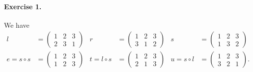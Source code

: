 \documentclass{article}
\begin{document}
\paragraph{Exercise 1.}

We have
\begin{align*}
    l &= \begin{pmatrix}
        1 & 2 & 3 \\
        2 & 3 & 1
    \end{pmatrix}&
    r &= \begin{pmatrix}
        1 & 2 & 3 \\
        3 & 1 & 2
    \end{pmatrix}&
    s &= \begin{pmatrix}
        1 & 2 & 3 \\
        1 & 3 & 2
    \end{pmatrix}\\
    e = s \circ s &= \begin{pmatrix}
        1 & 2 & 3 \\
        1 & 2 & 3
    \end{pmatrix}&
    t = l \circ s &= \begin{pmatrix}
        1 & 2 & 3 \\
        2 & 1 & 3
    \end{pmatrix}&
    u = s \circ l &= \begin{pmatrix}
        1 & 2 & 3 \\
        3 & 2 & 1
    \end{pmatrix}.
\end{align*}
\end{document}
